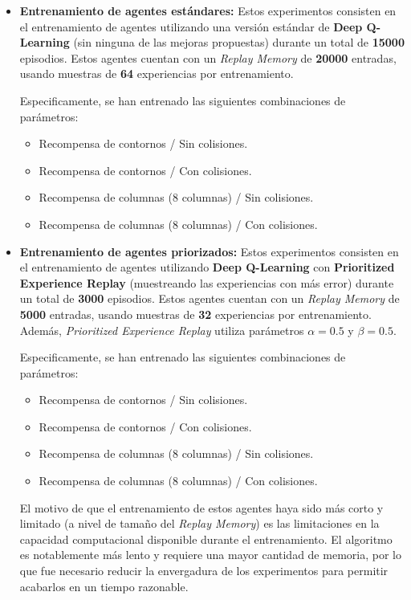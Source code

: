 \begin{itemize}
	\item \textbf{Entrenamiento de agentes estándares:} Estos experimentos consisten en el entrenamiento de agentes utilizando una versión estándar de \textbf{Deep Q-Learning} (sin ninguna de las mejoras propuestas) durante un total de \textbf{15000} episodios. Estos agentes cuentan con un \textit{Replay Memory} de \textbf{20000} entradas, usando muestras de \textbf{64} experiencias por entrenamiento.
	
	Especificamente, se han entrenado las siguientes combinaciones de parámetros:
	\begin{itemize}
		\item Recompensa de contornos / Sin colisiones.
		\item Recompensa de contornos / Con colisiones.
		\item Recompensa de columnas (8 columnas) / Sin colisiones.
		\item Recompensa de columnas (8 columnas) / Con colisiones.
	\end{itemize}
	
	\item \textbf{Entrenamiento de agentes priorizados:} Estos experimentos consisten en el entrenamiento de agentes utilizando \textbf{Deep Q-Learning} con \textbf{Prioritized Experience Replay} (muestreando las experiencias con más error) durante un total de \textbf{3000} episodios. Estos agentes cuentan con un \textit{Replay Memory} de \textbf{5000} entradas, usando muestras de \textbf{32} experiencias por entrenamiento. Además, \textit{Prioritized Experience Replay} utiliza parámetros $\alpha = 0.5$ y $\beta = 0.5$.
	
	Especificamente, se han entrenado las siguientes combinaciones de parámetros:
	\begin{itemize}
		\item Recompensa de contornos / Sin colisiones.
		\item Recompensa de contornos / Con colisiones.
		\item Recompensa de columnas (8 columnas) / Sin colisiones.
		\item Recompensa de columnas (8 columnas) / Con colisiones.
	\end{itemize}
	
	El motivo de que el entrenamiento de estos agentes haya sido más corto y limitado (a nivel de tamaño del \textit{Replay Memory}) es las limitaciones en la capacidad computacional disponible durante el entrenamiento. El algoritmo es notablemente más lento y requiere una mayor cantidad de memoria, por lo que fue necesario reducir la envergadura de los experimentos para permitir acabarlos en un tiempo razonable. 
\end{itemize}

